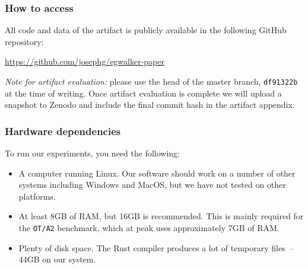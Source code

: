 \documentclass[sigplan,10pt]{acmart}
\begin{document}

\subsubsection{How to access}

All code and data of the artifact is publicly available in the following GitHub repository:

\url{https://github.com/josephg/egwalker-paper}

\textit{Note for artifact evaluation:} please use the head of the master branch, \texttt{df91322b} at the time of writing. Once artifact evaluation is complete we will upload a snapshot to Zenodo and include the final commit hash in the artifact appendix. %


\subsubsection{Hardware dependencies}

To run our experiments, you need the following:

\begin{itemize}
    \item A computer running Linux. Our software should work on a number of other systems including Windows and MacOS, but we have not tested on other platforms.
    \item At least 8GB of RAM, but 16GB is recommended. This is mainly required for the \texttt{OT/A2} benchmark, which at peak uses approximately 7GB of RAM.
    \item Plenty of disk space. The Rust compiler produces a lot of temporary files~-- 44GB on our system.
\end{itemize}
\end{document}
